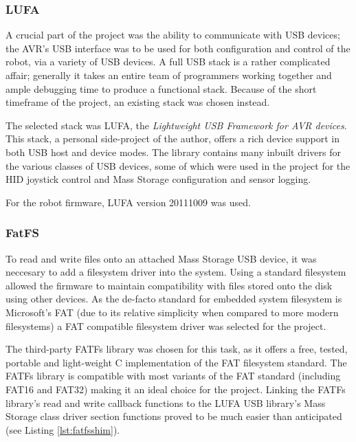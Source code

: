 \FloatBarrier
\subsubsection{LUFA}

A crucial part of the project was the ability to communicate with USB devices; the AVR's USB interface was to be used for both configuration and control of the robot, via a variety of USB devices. A full USB stack is a rather complicated affair; generally it takes an entire team of programmers working together and ample debugging time to produce a functional stack. Because of the short timeframe of the project, an existing stack was chosen instead.

The selected stack was LUFA, the \textit{Lightweight USB Framework for AVR devices}. This stack, a personal side-project of the author, offers a rich device support in both USB host and device modes. The library contains many inbuilt drivers for the various classes of USB devices, some of which were used in the project for the HID joystick control and Mass Storage configuration and sensor logging.

For the robot firmware, LUFA version 20111009 was used.

\FloatBarrier
\subsubsection{FatFS}

To read and write files onto an attached Mass Storage USB device, it was neccesary to add a filesystem driver into the system. Using a standard filesystem allowed the firmware to maintain compatibility with files stored onto the disk using other devices. As the de-facto standard for embedded system filesystem is Microsoft's FAT (due to its relative simplicity when compared to more modern filesystems) a FAT compatible filesystem driver was selected for the project.

The third-party FATFs library was chosen for this task, as it offers a free, tested, portable and light-weight C implementation of the FAT filesystem standard. The FATFs library is compatible with most variants of the FAT standard (including FAT16 and FAT32) making it an ideal choice for the project. Linking the FATFs library's read and write callback functions to the LUFA USB library's Mass Storage class driver section functions proved to be much easier than anticipated (see Listing \ref{lst:fatfsshim}).



